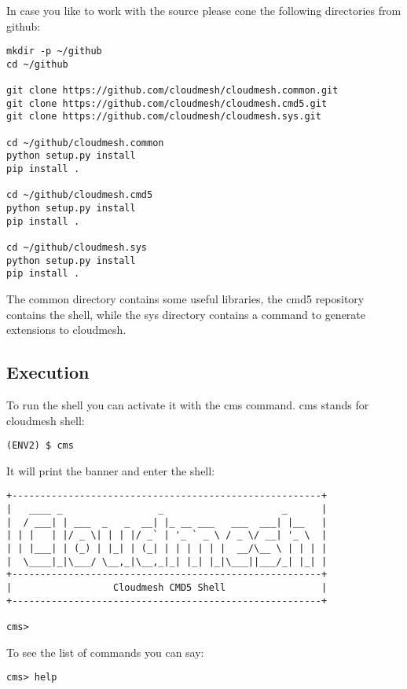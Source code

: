 In case you like to work with the source please cone the following
directories from github:

\begin{verbatim}
mkdir -p ~/github
cd ~/github

git clone https://github.com/cloudmesh/cloudmesh.common.git
git clone https://github.com/cloudmesh/cloudmesh.cmd5.git
git clone https://github.com/cloudmesh/cloudmesh.sys.git  

cd ~/github/cloudmesh.common
python setup.py install
pip install .

cd ~/github/cloudmesh.cmd5
python setup.py install
pip install .

cd ~/github/cloudmesh.sys
python setup.py install
pip install .
\end{verbatim}

The common directory contains some useful libraries, the cmd5 repository
contains the shell, while the sys directory contains a command to
generate extensions to cloudmesh.

\subsection{Execution}\label{execution}

To run the shell you can activate it with the cms command. cms stands
for cloudmesh shell:

\begin{verbatim}
(ENV2) $ cms
\end{verbatim}

It will print the banner and enter the shell:

\begin{verbatim}
+-------------------------------------------------------+
|   ____ _                 _                     _      |
|  / ___| | ___  _   _  __| |_ __ ___   ___  ___| |__   |
| | |   | |/ _ \| | | |/ _` | '_ ` _ \ / _ \/ __| '_ \  |
| | |___| | (_) | |_| | (_| | | | | | |  __/\__ \ | | | |
|  \____|_|\___/ \__,_|\__,_|_| |_| |_|\___||___/_| |_| |
+-------------------------------------------------------+
|                  Cloudmesh CMD5 Shell                 |
+-------------------------------------------------------+

cms>
\end{verbatim}

To see the list of commands you can say:

\begin{verbatim}
cms> help
\end{verbatim}

